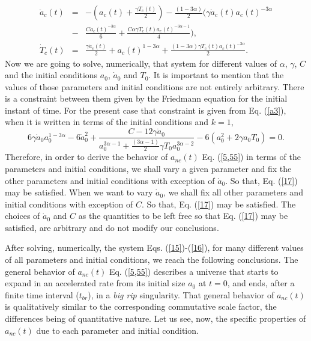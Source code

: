 \documentclass[12pt]{article}
\newcommand{\0}{{(0)}}
\newcommand{\1}{{(1)}}
\newcommand{\2}{{(2)}}
\begin{document}
{\begin{eqnarray}
\ddot{a}_{c}(t) & = &  - ( a_{c}(t) +\frac{\gamma T_{c}(t)}{2} )  
- \frac{(1 - 3\alpha)}{2}( \gamma \dot{a}_{c}(t) a_{c}(t)^{-3\alpha}  \nonumber \\
&-&\frac{C a_{c}(t)^{-3\alpha}}{6} +\frac{C\alpha \gamma T_{c}(t)a_{c}(t)^{-3\alpha - 1}}{4} ), \label{15}\\
\dot{T}_{c}(t) & =&  \frac{\gamma \dot{a}_{c}(t)}{2} + a_{c}(t)^{1 - 3\alpha} + \frac{(1 - 3\alpha)\gamma T_{c}(t) a_{c}(t)^{-3\alpha}}{2}. 
\label{16}
\end{eqnarray}
Now we are going to solve, numerically, that system for different values of $\alpha$, $\gamma$, $C$ and the initial conditions $a_0$, $\dot{a}_0$ and $T_0$.
It is important to 
mention that the values of those parameters and initial conditions are not entirely arbitrary. There is a constraint between them
given by the Friedmann equation for the initial instant of time. For the present case that constraint is given from Eq. (\ref{a3}),
when it is written in terms of the initial conditions and $k=1$,
\begin{equation}
\label{17}
6\gamma \dot{a}_{0} a_0^{1 - 3\alpha} - 6\dot{a}_0^2 + \frac{C - 12\gamma \dot{a}_0}{a_0^{3\alpha - 1} + 
\frac{(3\alpha - 1)}{2}\gamma T_{0}a_{0}^{3\alpha - 2}} -6(a_0^2 + 2\gamma a_0 T_{0}) = 0.
\end{equation}
Therefore, in order to derive the behavior of $a_{nc}(t)$ Eq. (\ref{5,55}) in terms of the parameters and initial conditions, we
shall vary a given parameter and fix the other parameters and initial conditions with exception of $\dot a_0$. So that, Eq. (\ref{17})
may be satisfied. When we want to vary $\dot{a}_0$, we shall fix all other parameters and initial conditions with exception of $C$.
So that, Eq. (\ref{17}) may be satisfied. The choices of $\dot{a}_0$ and $C$ as the quantities to be left free so that Eq. (\ref{17})
may be satisfied, are arbitrary and do not modify our conclusions.

After solving, numerically, the system Eqs. (\ref{15})-(\ref{16}), for many different
values of all parameters and initial conditions, we reach the following conclusions.
The general behavior of $a_{nc}(t)$ Eq. (\ref{5,55}) describes a universe that starts
to expand in an accelerated rate from its initial size $a_0$ at $t=0$, and ends, after
a finite time interval ($t_{br}$), in a {\it big rip} singularity. That general
behavior of $a_{nc}(t)$ is qualitatively similar to the corresponding commutative
scale factor, the differences being of quantitative nature. Let us see, now, the
specific properties of $a_{nc}(t)$ due to each parameter and initial condition.

}
\end{document}
